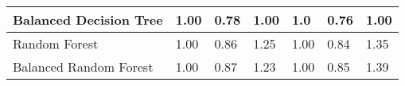 \begin{table}[]
{\begin{tabular}{l|lll|lll|}
  \multicolumn{1}{|l|}{Balanced Decision Tree}       & \multicolumn{1}{l|}{1.00}                & \multicolumn{1}{l|}{0.78}  & 1.00                                  & \multicolumn{1}{l|}{1.0}                & \multicolumn{1}{l|}{0.76} & 1.00                                  \\ \hline
  \multicolumn{1}{|l|}{Random Forest}                & \multicolumn{1}{l|}{1.00}                & \multicolumn{1}{l|}{0.86} & 1.25                   & \multicolumn{1}{l|}{1.00}                & \multicolumn{1}{l|}{0.84} & 1.35                   \\ \hline
  \multicolumn{1}{|l|}{Balanced Random Forest}       & \multicolumn{1}{l|}{1.00} & \multicolumn{1}{l|}{0.87} & 1.23                   & \multicolumn{1}{l|}{1.00}                & \multicolumn{1}{l|}{0.85} & 1.39                    \\ \hline
  \end{tabular}
}
\end{table}


